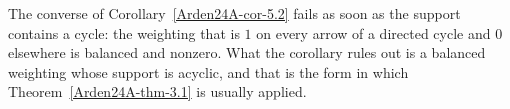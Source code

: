\begin{remark}\label{Arden24A-rem-5.3}
\label{Arden24A-rem:local}
The converse of Corollary~\ref{Arden24A-cor-5.2} fails as soon as the support contains a cycle: the weighting that is $1$ on every arrow of a directed cycle and $0$ elsewhere is balanced and nonzero. What the corollary rules out is a balanced weighting whose support is acyclic, and that is the form in which Theorem~\ref{Arden24A-thm-3.1} is usually applied.
\end{remark}